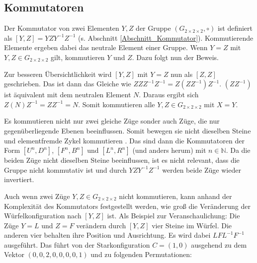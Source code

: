 \documentclass[12pt,a4paper, usenames, dvipsnames]{article}
\theoremstyle{mystyle}
\theoremstyle{definition}
\newcommand{\Gtwo}{\ensuremath{G_{2\times 2\times 2}}}
\begin{document}
%
%
%
%
%
%
%
%
%
%
%
%
%
%
%
%
%
%
%
%
\subsection{Kommutatoren}

Der Kommutator von zwei Elementen $Y, Z$ der Gruppe $(\Gtwo, \circ)$ ist definiert als $[Y,Z]=YZY^{-1}Z^{-1}$ (s. Abschnitt \ref{Abschnitt_Kommutator}).
Kommutierende Elemente ergeben dabei das neutrale Element einer Gruppe. 
Wenn $Y = Z$ mit $Y, Z \in \Gtwo$ gilt, kommutieren $Y$ und $Z$. 
Dazu folgt nun der Beweis. 

Zur besseren Übersichtlichkeit wird $[Y,Z]$ mit $Y=Z$ nun als $[Z,Z]$ geschrieben. Das ist dann das Gleiche wie $ZZZ^{-1}Z^{-1} = Z(ZZ^{-1})Z^{-1}$. 
$(ZZ^{-1})$ ist äquivalent mit dem neutralen Element $N$. Daraus ergibt sich $Z(N)Z^{-1} = ZZ^{-1} = N$. 
Somit kommutieren alle $Y, Z \in \Gtwo$ mit $X=Y$.


Es kommutieren nicht nur zwei gleiche Züge sonder auch Züge, die nur gegenüberliegende Ebenen beeinflussen. Somit bewegen sie nicht dieselben Steine und elementfremde Zykel kommutieren \cite{OS}.
Das sind dann die Kommutatoren der Form $[U^n, D^n]$, $[F^n, B^n]$ und $[L^n, R^n]$ (und anders herum) mit $n \in \mathbb{N}$. 
Da die beiden Züge nicht dieselben Steine beeinflussen, ist es nicht relevant, dass die Gruppe nicht kommutativ ist und durch $YZY^{-1}Z^{-1}$ werden beide Züge wieder invertiert.


Auch wenn zwei Züge $Y, Z \in \Gtwo$ nicht kommutieren, kann anhand der Komplexität des Kommutators festgestellt werden, wie groß die Veränderung der Würfelkonfiguration nach $[Y, Z]$ ist. 
Als Beispiel zur Veranschaulichung: Die Züge $Y=L$ und $Z=F$ verändern durch $[Y, Z]$ vier Steine im Würfel. Die anderen vier behalten ihre Position und Ausrichtung. 
Es wird dabei $LFL^{-1}F^{-1}$ ausgeführt. Das führt von der Starkonfiguration $C =(1,0)$ ausgehend zu dem Vektor $(0,0,2,0,0,0,0,1)$ und zu folgenden Permutationen:
\end{document}
